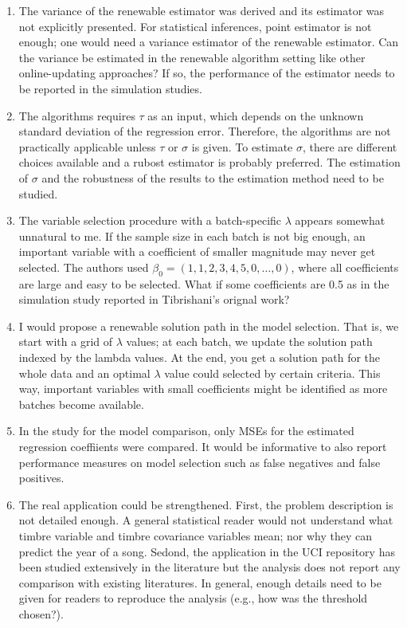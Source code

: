 \documentclass[12pt]{article}
\begin{document}
\begin{enumerate}
\item
  The variance of the renewable estimator was derived and its estimator
  was not explicitly presented. For statistical inferences, point
  estimator is not enough; one would need a variance estimator of the
  renewable estimator. Can the variance be estimated in the renewable
  algorithm setting like other online-updating approaches? If so, the
  performance of the estimator needs to be reported in the simulation
  studies.
\item
  The algorithms requires \(\tau\) as an input, which depends on the
  unknown standard deviation of the regression error. Therefore, the
  algorithms are not practically applicable unless \(\tau\) or
  \(\sigma\) is given. To estimate \(\sigma\), there are different
  choices available and a rubost estimator is probably preferred. The
  estimation of \(\sigma\) and the robustness of the results to the
  estimation method need to be studied.
\item
  The variable selection procedure with a batch-specific \(\lambda\)
  appears somewhat unnatural to me. If the sample size in each batch is
  not big enough, an important variable with a coefficient of smaller
  magnitude may never get selected. The authors used
  \(\beta_0 = (1, 1, 2, 3, 4, 5, 0, \ldots, 0)\), where all coefficients
  are large and easy to be selected. What if some coefficients are 0.5
  as in the simulation study reported in Tibrishani's orignal work?
\item
  I would propose a renewable solution path in the model selection. That
  is, we start with a grid of \(\lambda\) values; at each batch, we
  update the solution path indexed by the lambda values. At the end, you
  get a solution path for the whole data and an optimal \(\lambda\)
  value could selected by certain criteria. This way, important
  variables with small coefficients might be identified as more batches
  become available.
\item
  In the study for the model comparison, only MSEs for the estimated
  regression coeffiients were compared. It would be informative to also
  report performance measures on model selection such as false negatives
  and false positives.
\item
  The real application could be strengthened. First, the problem
  description is not detailed enough. A general statistical reader would
  not understand what timbre variable and timbre covariance variables
  mean; nor why they can predict the year of a song. Sedond, the
  application in the UCI repository has been studied extensively in the
  literature but the analysis does not report any comparison with
  existing literatures. In general, enough details need to be given for
  readers to reproduce the analysis (e.g., how was the threshold
  chosen?).
\end{enumerate}
\end{document}

